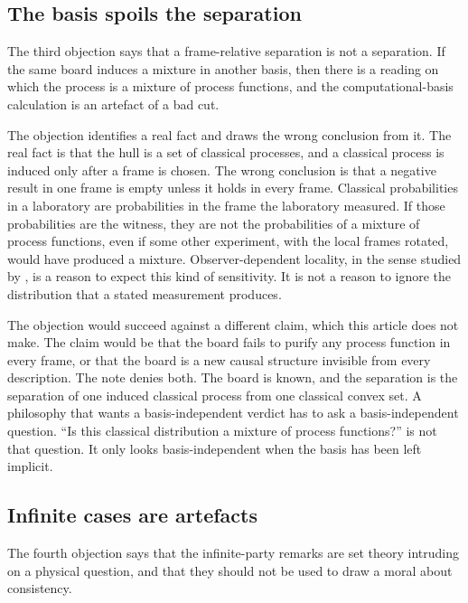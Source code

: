 \documentclass[11pt]{article}
\begin{document}
\subsection{The basis spoils the separation}
\label{sec:frameobj}

The third objection says that a frame-relative separation is not a separation. If the same board induces a mixture in another basis, then there is a reading on which the process is a mixture of process functions, and the computational-basis calculation is an artefact of a bad cut.

The objection identifies a real fact and draws the wrong conclusion from it. The real fact is that the hull is a set of classical processes, and a classical process is induced only after a frame is chosen. The wrong conclusion is that a negative result in one frame is empty unless it holds in every frame. Classical probabilities in a laboratory are probabilities in the frame the laboratory measured. If those probabilities are the witness, they are not the probabilities of a mixture of process functions, even if some other experiment, with the local frames rotated, would have produced a mixture. Observer-dependent locality, in the sense studied by \citet{guerin2018}, is a reason to expect this kind of sensitivity. It is not a reason to ignore the distribution that a stated measurement produces.

The objection would succeed against a different claim, which this article does not make. The claim would be that the board fails to purify any process function in every frame, or that the board is a new causal structure invisible from every description. The note denies both. The board is known, and the separation is the separation of one induced classical process from one classical convex set. A philosophy that wants a basis-independent verdict has to ask a basis-independent question. ``Is this classical distribution a mixture of process functions?'' is not that question. It only looks basis-independent when the basis has been left implicit.

\subsection{Infinite cases are artefacts}
\label{sec:inf}

The fourth objection says that the infinite-party remarks are set theory intruding on a physical question, and that they should not be used to draw a moral about consistency.
\end{document}

